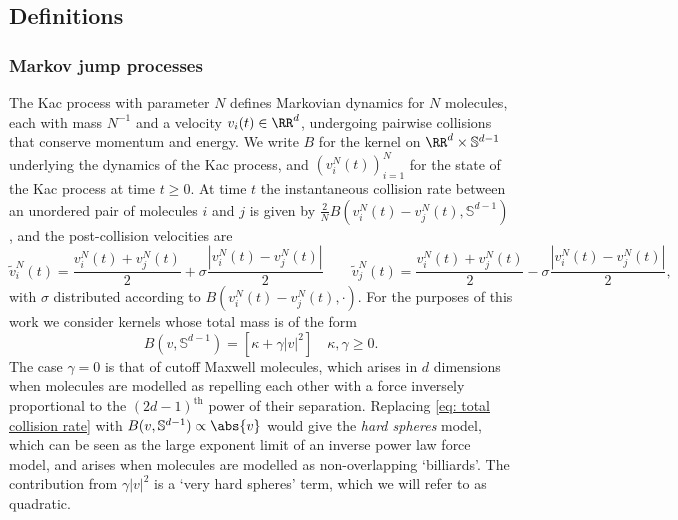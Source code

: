 \subsection{Definitions}
\subsubsection{Markov jump processes}\label{s:jump_procs}
The Kac process with parameter $N$ defines Markovian dynamics for $N$ molecules, each with mass $N^{-1}$ and a velocity $v_i(t)\in\RR^d$, undergoing pairwise collisions that conserve momentum and energy. We write $B$ for the kernel on $\RR^d \times \mathbb{S}^{d-1}$ underlying the dynamics of the Kac process, and $\left(v_i^N(t)\right)_{i=1}^N$ for the state of the Kac process at time $t\ge 0$.
At time $t$ the instantaneous collision rate between an unordered pair of molecules $i$ and $j$ is given by $\frac2NB(v_i^N(t) - v_j^N(t), \mathbb{S}^{d-1})$, and the post-collision velocities are
\begin{equation*}
    \widetilde{v}_i^N(t)=\frac{v_i^N(t) + v_j^N(t)}{2} + \sigma \frac{|v_i^N(t) - v_j^N(t)|}{2}
    \qquad
    \widetilde{v}_j^N(t)=\frac{v_i^N(t) + v_j^N(t)}{2} - \sigma \frac{|v_i^N(t) - v_j^N(t)|}{2},
\end{equation*}
with $\sigma$ distributed according to $B(v_i^N(t) - v_j^N(t), \cdot)$.
For the purposes of this work we consider kernels whose total mass is of the form
\begin{equation} \label{eq: total collision rate}
    B(v, \mathbb{S}^{d-1}) =
  \left[\kappa + \gamma |v|^2 \right]
    \quad \kappa,\gamma \geq 0.
\end{equation}
The case $\gamma = 0$ is that of cutoff Maxwell molecules, which arises in $d$ dimensions when molecules are modelled as repelling each other with a force inversely proportional to the $(2d-1)^\text{th}$ power of their separation.
Replacing \eqref{eq: total collision rate} with $B(v, \mathbb{S}^{d-1}) \propto \abs{v}$ would give the \emph{hard spheres} model, which can be seen as the large exponent limit of an inverse power law force model, and arises when molecules are modelled as non-overlapping `billiards'.
The contribution from $\gamma |v|^2$ is a `very hard spheres' term, which we will refer to as quadratic.

